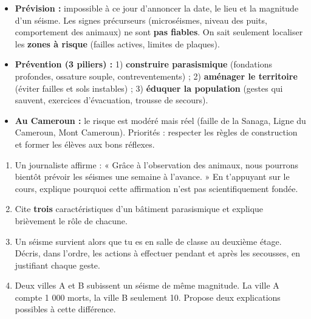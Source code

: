 \documentclass[11pt]{article}
\begin{document}
\begin{aretenir}
\begin{itemize}
    \item \textbf{Prévision :} impossible à ce jour d'annoncer la date, le lieu et la magnitude d'un séisme. Les signes précurseurs (microséismes, niveau des puits, comportement des animaux) ne sont \textbf{pas fiables}. On sait seulement localiser les \textbf{zones à risque} (failles actives, limites de plaques).
    \item \textbf{Prévention (3 piliers) :} 1) \textbf{construire parasismique} (fondations profondes, ossature souple, contreventements) ; 2) \textbf{aménager le territoire} (éviter failles et sols instables) ; 3) \textbf{éduquer la population} (gestes qui sauvent, exercices d'évacuation, trousse de secours).
    \item \textbf{Au Cameroun :} le risque est modéré mais réel (faille de la Sanaga, Ligne du Cameroun, Mont Cameroun). Priorités : respecter les règles de construction et former les élèves aux bons réflexes.
\end{itemize}
\end{aretenir}

\begin{exercice}
\begin{enumerate}
    \item Un journaliste affirme : « Grâce à l'observation des animaux, nous pourrons bientôt prévoir les séismes une semaine à l'avance. » En t'appuyant sur le cours, explique pourquoi cette affirmation n'est pas scientifiquement fondée.
    \item Cite \textbf{trois} caractéristiques d'un bâtiment parasismique et explique brièvement le rôle de chacune.
    \item Un séisme survient alors que tu es en salle de classe au deuxième étage. Décris, dans l'ordre, les actions à effectuer pendant et après les secousses, en justifiant chaque geste.
    \item Deux villes A et B subissent un séisme de même magnitude. La ville A compte 1 000 morts, la ville B seulement 10. Propose deux explications possibles à cette différence.
\end{enumerate}
\end{exercice}
\end{document}
